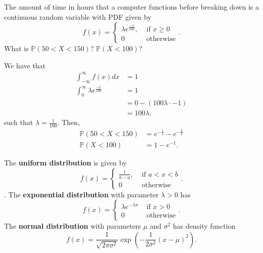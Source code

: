 \begin{eg}
	The amount of time in hours that a computer functions before breaking down is a continuous random variable with PDF given by \[
		f(x) = \begin{cases}
			\lambda e^{\frac{-x}{100}} , &\text{ if } x\ge 0\\
			0 &\text{ otherwise}
		\end{cases}
	.\] What is \( \mathbb{P}(50 < X < 150) \)? \( \mathbb{P}(X<100) \)?
\end{eg}
\begin{explanation}
	We have that 
	\begin{align*}
		\int_{-\infty}^{\infty} f(x) dx &= 1 \\
		\int_{0}^{\infty}\lambda e^{\frac{-x}{100}}  &= 1 \\
		&= 0 - (100\lambda \cdot -1) \\
		&= 100\lambda 
	.\end{align*}
	such that \( \lambda =\frac{1}{100} \). Then,
	\begin{align*}
		\mathbb{P}(50 < X < 150) &= e^{-\frac{1}{2}} - e^{-\frac{3}{2}}   \\
		\mathbb{P}(X < 100) &= 1-e^{-1} 
	.\end{align*}
\end{explanation}

\begin{definition}
	The \textbf{uniform distribution} is given by \[
		f(x) = \begin{cases}
			\frac{1}{b-a}, &\text{ if }a<x<b\\
			0 &\text{ otherwise}
		\end{cases}
	.\]. The \textbf{exponential distribution} with parameter \( \lambda >0 \) has \[
		f(x) = \begin{cases}
			\lambda e^{-\lambda x} &\text{ if } x>0  \\
			0 &\text{ otherwise}
		\end{cases}
	.\] The \textbf{normal distribution} with parameters \( \mu  \) and \( \sigma ^{2}  \) has density function \[
		f(x) = \frac{1}{\sqrt{2\pi \sigma ^{2} } }\exp \left( -\frac{1}{2\sigma ^{2} } (x-\mu )^{2}  \right) 
	.\] 
\end{definition}
